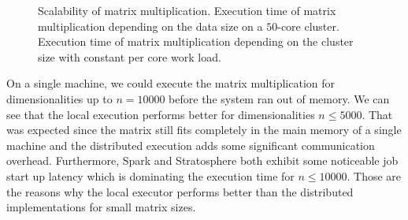 \begin{figure}
	\centering
	\begin{subfigure}{\dualpgfwidth}
		\caption{}
		\label{fig:mmLoadRuntime}
	\end{subfigure}
	\begin{subfigure}{\dualpgfwidth}
		\caption{}
		\label{fig:mmNodesRuntime}
	\end{subfigure}
	\caption{Scalability of matrix multiplication.  Execution time of matrix multiplication depending on the data size on a $50$-core cluster.  Execution time of matrix multiplication depending on the cluster size with constant per core work load.}
	\label{fig:mmBenchmark}
\end{figure}

On a single machine, we could execute the matrix multiplication for dimensionalities up to $n=10000$ before the system ran out of memory.
We can see that the local execution performs better for dimensionalities $n \le 5000$.
That was expected since the matrix still fits completely in the main memory of a single machine and the distributed execution adds some significant communication overhead.
Furthermore, Spark and Stratosphere both exhibit some noticeable job start up latency which is dominating the execution time for $n\le 10000$.
Those are the reasons why the local executor performs better than the distributed implementations for small matrix sizes.

